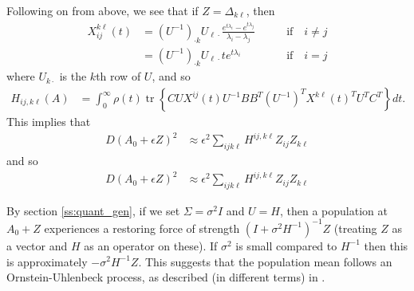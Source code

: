 \documentclass{article}
\newcommand{\tr}{\mathop{\mbox{tr}}} %
\newcommand{\1}{\mathbbm{1}}
\begin{document}
Following on from above, we see that if $Z=\Delta_{k \ell}$, then
\begin{equation}
  \begin{aligned}
      X_{ij}^{k\ell}(t) 
      &= 
      (U^{-1})_{\cdot k} U_{\ell \cdot}
      \frac{ e^{t \lambda_i} - e^{t \lambda_j} }{ \lambda_i - \lambda_j } 
          \qquad & \text{if} \quad i \neq j \\
      &=
      (U^{-1})_{\cdot k} U_{\ell \cdot}
      t e^{t \lambda_i} 
          \qquad & \text{if} \quad i = j 
  \end{aligned}
\end{equation}
where $U_{k \cdot}$ is the $k$th row of $U$,
and so
\begin{equation}
    \begin{aligned}
        H_{ij, k\ell}(A)
        &=
        \int_0^\infty
            \rho(t) \tr\left\{ C U X^{ij}(t) U^{-1} B B^T (U^{-1})^T X^{k\ell}(t)^T U^T C^T \right\}
        dt .
    \end{aligned}
\end{equation}
This implies that
\begin{equation}
    \begin{aligned}
        D(A_0+\epsilon Z)^2
        &\approx \epsilon^2\sum_{ijk\ell} H^{ij,k\ell} Z_{ij} Z_{k\ell} 
    \end{aligned}
\end{equation}
and so
\begin{equation}
    \begin{aligned}
        D(A_0+\epsilon Z)^2
        &\approx \epsilon^2\sum_{ijk\ell} H^{ij,k\ell} Z_{ij} Z_{k\ell} 
    \end{aligned}
\end{equation}

By section \ref{ss:quant_gen},
if we set $\Sigma=\sigma^2 I$ and $U=H$,
then a population at $A_0+Z$ experiences a restoring force of strength
$(I + \sigma^2 H^{-1})^{-1} Z$ (treating $Z$ as a vector and $H$ as an operator on these).
If $\sigma^2$ is small compared to $H^{-1}$
then this is approximately $-\sigma^2 H^{-1} Z$.
This suggests that the population mean follows an Ornstein-Uhlenbeck process,
as described (in different terms) in \citet{hansen1996translating}.
\end{document}
